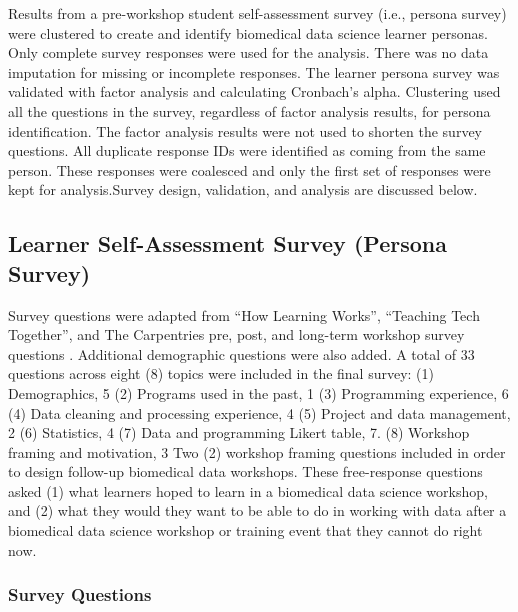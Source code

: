 \documentclass[020-persona\_validation.tex]{subfiles}
\begin{document}
    Results from a pre-workshop student self-assessment survey (i.e., persona survey)
    were clustered to create and identify biomedical data science learner personas.
    Only complete survey responses were used for the analysis.
    There was no data imputation for missing or incomplete responses.
    The learner persona survey was validated with factor analysis and calculating Cronbach's alpha.
    Clustering used all the questions in the survey,
    regardless of factor analysis results,
    for persona identification.
    The factor analysis results were not used to shorten the survey questions.
    All duplicate response IDs were identified as coming from the same person.
    These responses were coalesced and only the first set of responses were kept for analysis.Survey design, validation, and analysis are discussed below.
    
    \subsection{Learner Self-Assessment Survey (Persona Survey)}
    
        Survey questions were adapted from
        ``How Learning Works'',
        ``Teaching Tech Together'', and
        The Carpentries pre, post, and long-term workshop survey questions
        \cite{ambrose2010learning, wilson2019teaching, jordanAnalysisSoftwareData2018, jordanAnalysisCarpentriesLongTerm2020, jordanAnalysisCarpentriesLongTerm2018, jordanAnalysisCarpentriesLongTerm2017}.
        Additional demographic questions were also added.
        A total of 33 questions across eight (8) topics were included in the final survey:
        (1) Demographics, 5
        (2) Programs used in the past, 1
        (3) Programming experience, 6
        (4) Data cleaning and processing experience, 4
        (5) Project and data management, 2
        (6) Statistics, 4
        (7) Data and programming Likert table, 7.
        (8) Workshop framing and motivation, 3
        Two (2) workshop framing questions included in order to design follow-up biomedical data workshops.
        These free-response questions asked 
        (1) what learners hoped to learn in a biomedical data science workshop, and 
        (2) what they would they want to be able to do in working with data after a biomedical data science workshop
            or training event that they cannot do right now.

        \subsubsection{Survey Questions}
    
\end{document}
